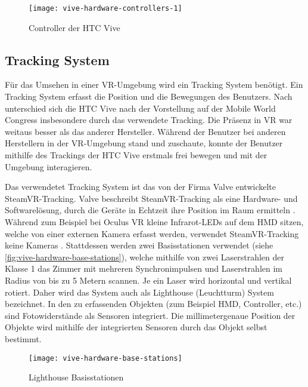 \begin{figure}[!htbp]
	\centering
	\texttt{[image: vive-hardware-controllers-1]}
	\caption[Controller der HTC Vive]{Controller der HTC Vive \cite{ViveControllers}}
	\label{fig:vive-hardware-controllers-1}
\end{figure}

\subsection{Tracking System}
Für das Umsehen in einer \ac{VR}-Umgebung wird ein Tracking System benötigt. Ein Tracking System erfasst die Position und die Bewegungen des Benutzers. Nach \citeauthor{Sauter.2015} unterschied sich die HTC Vive nach der Vorstellung auf der Mobile World Congress insbesondere durch das verwendete Tracking. Die Präsenz in \ac{VR} war weitaus besser als das anderer Hersteller. Während der Benutzer bei anderen Herstellern in der \ac{VR}-Umgebung stand und zuschaute, konnte der Benutzer mithilfe des Trackings der HTC Vive erstmals frei bewegen und mit der Umgebung interagieren. \cite{Sauter.2015} 

Das verwendetet Tracking System ist das von der Firma Valve entwickelte SteamVR-Tracking. Valve beschreibt SteamVR-Tracking als eine Hardware- und Softwarelösung, durch die Geräte in Echtzeit ihre Position im Raum ermitteln \cite{Valve.2020}. Während zum Beispiel bei Oculus VR kleine Infrarot-LEDs auf dem \ac{HMD} sitzen, welche von einer externen Kamera erfasst werden, verwendet SteamVR-Tracking keine Kameras \cite{Sauter.2015}. Stattdessen werden zwei Basisstationen verwendet (siehe \autoref{fig:vive-hardware-base-stations}), welche mithilfe von zwei Laserstrahlen der Klasse 1 \glqq das Zimmer mit mehreren Synchronimpulsen und Laserstrahlen im Radius von bis zu 5 Metern\grqq \cite{Valve.2020} scannen. Je ein Laser wird horizontal und vertikal rotiert. Daher wird das System auch als Lighthouse (Leuchtturm) System bezeichnet. In den zu erfassenden Objekten (zum Beispiel \ac{HMD}, Controller, etc.) sind Fotowiderstände als Sensoren integriert. Die millimetergenaue Position der Objekte wird mithilfe der integrierten Sensoren durch das Objekt selbst bestimmt. \cite{Yates.20160512}

\begin{figure}[!htbp]
	\centering
	\texttt{[image: vive-hardware-base-stations]}
	\caption[Lighthouse Basisstationen]{Lighthouse Basisstationen \cite{ViveBaseStation}}
	\label{fig:vive-hardware-base-stations}
\end{figure}

